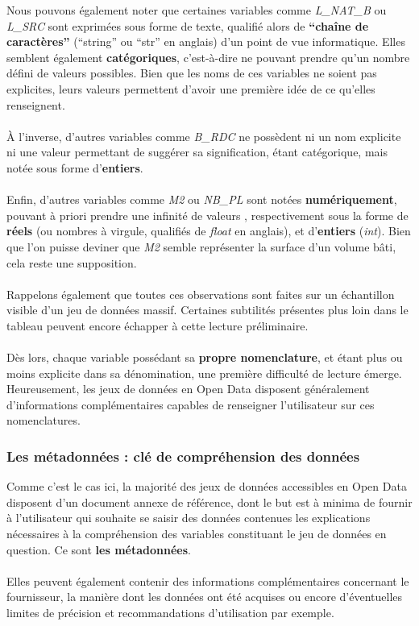 \documentclass[
  11pt,
  french,
]{article}
\begin{document}
\hfill\break
Nous pouvons également noter que certaines variables comme
\emph{L\_NAT\_B} ou \emph{L\_SRC} sont exprimées sous forme de texte,
qualifié alors de \textbf{``chaîne de caractères''} (``string'' ou
``str'' en anglais) d'un point de vue informatique. Elles semblent
également \textbf{catégoriques}, c'est-à-dire ne pouvant prendre qu'un
nombre défini de valeurs possibles. Bien que les noms de ces variables
ne soient pas explicites, leurs valeurs permettent d'avoir une première
idée de ce qu'elles renseignent.\\
~\\
À l'inverse, d'autres variables comme \emph{B\_RDC} ne possèdent ni un
nom explicite ni une valeur permettant de suggérer sa signification,
étant catégorique, mais notée sous forme d'\textbf{entiers}.\\
~\\
Enfin, d'autres variables comme \emph{M2} ou \emph{NB\_PL} sont notées
\textbf{numériquement}, pouvant à priori prendre une infinité de valeurs
, respectivement sous la forme de \textbf{réels} (ou nombres à virgule,
qualifiés de \emph{float} en anglais), et d'\textbf{entiers}
(\emph{int}). Bien que l'on puisse deviner que \emph{M2} semble
représenter la surface d'un volume bâti, cela reste une supposition.\\
~\\
Rappelons également que toutes ces observations sont faites sur un
échantillon visible d'un jeu de données massif. Certaines subtilités
présentes plus loin dans le tableau peuvent encore échapper à cette
lecture préliminaire.\\
~\\
Dès lors, chaque variable possédant sa \textbf{propre nomenclature}, et
étant plus ou moins explicite dans sa dénomination, une première
difficulté de lecture émerge. Heureusement, les jeux de données en Open
Data disposent généralement d'informations complémentaires capables de
renseigner l'utilisateur sur ces nomenclatures.\\

\newpage

\hypertarget{les-muxe9tadonnuxe9es-cluxe9-de-compruxe9hension-des-donnuxe9es}{%
\subsubsection{Les métadonnées : clé de compréhension des
données}\label{les-muxe9tadonnuxe9es-cluxe9-de-compruxe9hension-des-donnuxe9es}}

Comme c'est le cas ici, la majorité des jeux de données accessibles en
Open Data disposent d'un document annexe de référence, dont le but est à
minima de fournir à l'utilisateur qui souhaite se saisir des données
contenues les explications nécessaires à la compréhension des variables
constituant le jeu de données en question. Ce sont \textbf{les
métadonnées}.\\
~\\
Elles peuvent également contenir des informations complémentaires
concernant le fournisseur, la manière dont les données ont été acquises
ou encore d'éventuelles limites de précision et recommandations
d'utilisation par exemple.\\
\end{document}
